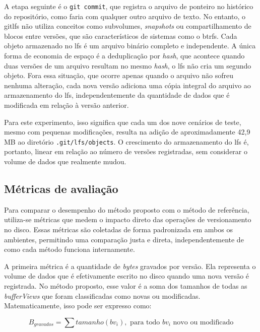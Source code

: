 A etapa seguinte é o \texttt{git commit}, que registra o arquivo de ponteiro no
histórico do repositório, como faria com qualquer outro arquivo de texto. No
entanto, o \gls{gitlfs} não utiliza conceitos como subvolumes, \textit{snapshots} ou
compartilhamento de blocos entre versões, que são característicos de sistemas como o
\gls{btrfs}. Cada objeto armazenado no \gls{lfs} é um arquivo binário completo e
independente. A única forma de economia de espaço é a deduplicação por
\textit{hash}, que acontece quando duas versões de um arquivo resultam no mesmo
\textit{hash}, o \gls{lfs} não cria um segundo objeto. Fora essa situação, que
ocorre apenas quando o arquivo não sofreu nenhuma alteração, cada nova versão
adiciona uma cópia integral do arquivo ao armazenamento do \gls{lfs},
independentemente da quantidade de dados que é modificada em relação à versão
anterior.

Para este experimento, isso significa que cada um dos nove cenários de teste, mesmo
com pequenas modificações, resulta na adição de aproximadamente 42,9 MB ao diretório
\texttt{.git/lfs/objects}. O crescimento do armazenamento do \gls{lfs} é, portanto,
linear em relação ao número de versões registradas, sem considerar o volume de dados
que realmente mudou.

\subsection{Métricas de avaliação}

Para comparar o desempenho do método proposto com o método de referência, utiliza-se
métricas que medem o impacto direto das operações de versionamento no disco. Essas
métricas são coletadas de forma padronizada em ambos os ambientes, permitindo uma
comparação justa e direta, independentemente de como cada método funciona
internamente.

A primeira métrica é a quantidade de \textit{bytes} gravados por versão. Ela
representa o volume de dados que é efetivamente escrito no disco quando uma nova
versão é registrada. No método proposto, esse valor é a soma dos tamanhos de todas
as \textit{bufferViews} que foram classificadas como novas ou modificadas.
Matematicamente, isso pode ser expresso como:

\begin{equation}
  \label{eq:bytes-gravados}
  B_{gravados} = \sum tamanho(bv_i), \text{ para todo } bv_i \text{ novo ou modificado}
\end{equation}

